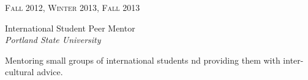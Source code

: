 \documentclass[10pt]{article} %
\begin{document}
{\begin{minipage}[t]{0.5\textwidth}

{\raggedleft\textsc{Fall 2012, Winter 2013, Fall 2013}\par}
{\raggedright\large International Student Peer Mentor\\
\textit{Portland State University}\\[5pt]}
\normalsize{
Mentoring small groups of international students
nd providing them with inter-cultural advice.
}\\














\end{minipage} %
\hfill
\begin{minipage}[t]{0.44\textwidth} %
\vspace{0pt} %


\end{minipage}}
\end{document}
